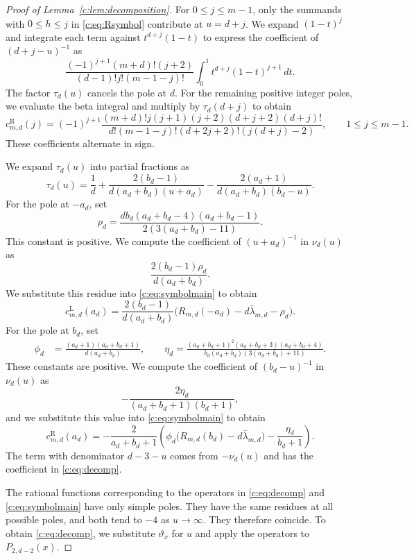 \documentclass[10pt,a4paper]{article}
\numberwithin{equation}{section}
\theoremstyle{remark}\newtheorem{remark}[theorem]{Remark}
\newcommand{\varthetax}{\vartheta_x}
\begin{document}
\begin{proof}[Proof of Lemma~\ref{c:lem:decomposition}]
For $0\le j\le m-1$, only the summands with $0\le h\le j$ in
\eqref{c:eq:Rsymbol} contribute at $u=d+j$.
We expand $(1-t)^j$ and integrate each term against $t^{d+j}(1-t)$
to express the coefficient of $(d+j-u)^{-1}$ as
\[
 \frac{(-1)^{j+1}(m+d)!(j+2)}{(d-1)!j!(m-1-j)!}
 \int_0^1t^{d+j}(1-t)^{j+1}\,dt.
\]
The factor $\tau_d(u)$ cancels the pole at $d$. For the remaining
positive integer poles, we evaluate the beta integral and multiply
by $\tau_d(d+j)$ to obtain
\begin{equation}\label{c:eq:rightinteger}
 c_{m,d}^{\mathrm R}(j)=(-1)^{j+1}
 \frac{(m+d)!j(j+1)(j+2)(d+j+2)(d+j)!}
 {d!(m-1-j)!(d+2j+2)!(j(d+j)-2)},
 \qquad 1\le j\le m-1.
\end{equation}
These coefficients alternate in sign.

We expand $\tau_d(u)$ into partial fractions as
\[
 \tau_d(u)=\frac1d+\frac{2(b_d-1)}{d(a_d+b_d)(u+a_d)}
 -\frac{2(a_d+1)}{d(a_d+b_d)(b_d-u)}.
\]
For the pole at $-a_d$, set
\[
 \rho_d=\frac{db_d(a_d+b_d-4)(a_d+b_d-1)}
 {2(3(a_d+b_d)-11)}.
\]
This constant is positive.
We compute the coefficient of $(u+a_d)^{-1}$ in $\nu_d(u)$ as
\[
 \frac{2(b_d-1)\rho_d}{d(a_d+b_d)}.
\]
We substitute this residue into \eqref{c:eq:symbolmain} to obtain
\begin{equation}\label{c:eq:leftstar}
 c_{m,d}^{\mathrm L}(a_d)=\frac{2(b_d-1)}{d(a_d+b_d)}
 \bigl(R_{m,d}(-a_d)-d\bar\lambda_{m,d}-\rho_d\bigr).
\end{equation}
For the pole at $b_d$, set
\[
 \begin{aligned}
 \phi_d&=\frac{(a_d+1)(a_d+b_d+1)}{d(a_d+b_d)},\qquad
 \eta_d=\frac{(a_d+b_d+1)^2(a_d+b_d+3)(a_d+b_d+4)}
 {b_d(a_d+b_d)(3(a_d+b_d)+11)}.
 \end{aligned}
\]
These constants are positive.
We compute the coefficient of $(b_d-u)^{-1}$ in $\nu_d(u)$ as
\[
 -\frac{2\eta_d}{(a_d+b_d+1)(b_d+1)},
\]
and we substitute this value into \eqref{c:eq:symbolmain} to obtain
\begin{equation}\label{c:eq:rightstar}
 c_{m,d}^{\mathrm R}(a_d)=-\frac{2}{a_d+b_d+1}
 \left(\phi_d\bigl(R_{m,d}(b_d)-d\bar\lambda_{m,d}\bigr)
 -\frac{\eta_d}{b_d+1}\right).
\end{equation}
The term with denominator $d-3-u$ comes from $-\nu_d(u)$ and has the
coefficient in \eqref{c:eq:decomp}.

The rational functions corresponding to the operators in
\eqref{c:eq:decomp} and \eqref{c:eq:symbolmain} have only simple poles.
They have the same residues at all possible poles, and both tend to
$-4$ as $u\to\infty$.
They therefore coincide. To obtain \eqref{c:eq:decomp}, we substitute
$\varthetax$ for $u$ and apply the operators to $P_{2,d-2}(x)$.
\end{proof}
\end{document}
